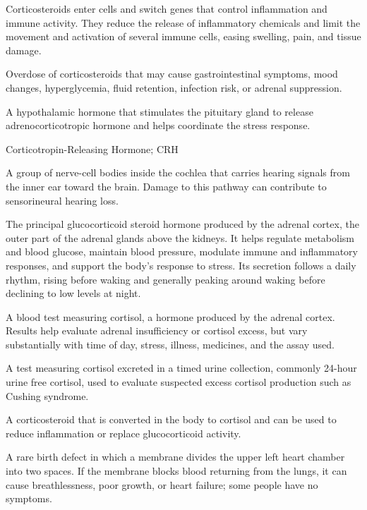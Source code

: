  Corticosteroids enter cells and switch genes that control inflammation and immune activity. They reduce the release of inflammatory chemicals and limit the movement and activation of several immune cells, easing swelling, pain, and tissue damage.

 Overdose of corticosteroids that may cause gastrointestinal symptoms, mood changes, hyperglycemia, fluid retention, infection risk, or adrenal suppression.

 A hypothalamic hormone that stimulates the pituitary gland to release adrenocorticotropic hormone and helps coordinate the stress response.

\synonyms
Corticotropin-Releasing Hormone; CRH

 A group of nerve-cell bodies inside the cochlea that carries hearing signals from the inner ear toward the brain. Damage to this pathway can contribute to sensorineural hearing loss.

 The principal glucocorticoid steroid hormone produced by the adrenal cortex, the outer part of the adrenal glands above the kidneys. It helps regulate metabolism and blood glucose, maintain blood pressure, modulate immune and inflammatory responses, and support the body's response to stress. Its secretion follows a daily rhythm, rising before waking and generally peaking around waking before declining to low levels at night.

 A blood test measuring cortisol, a hormone produced by the adrenal cortex. Results help evaluate adrenal insufficiency or cortisol excess, but vary substantially with time of day, stress, illness, medicines, and the assay used.

 A test measuring cortisol excreted in a timed urine collection, commonly 24-hour urine free cortisol, used to evaluate suspected excess cortisol production such as Cushing syndrome.

 A corticosteroid that is converted in the body to cortisol and can be used to reduce inflammation or replace glucocorticoid activity.

 A rare birth defect in which a membrane divides the upper left heart chamber into two spaces. If the membrane blocks blood returning from the lungs, it can cause breathlessness, poor growth, or heart failure; some people have no symptoms.

